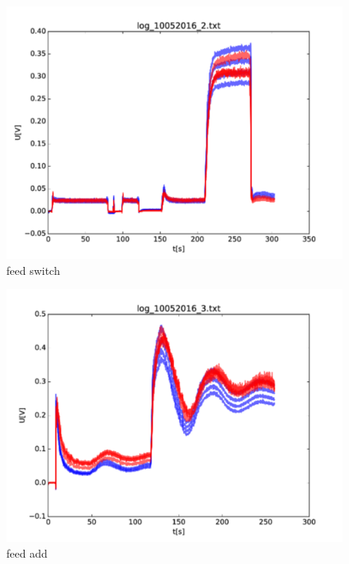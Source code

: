 \begin{figure}
	\begin{center}
		\includegraphics[width=\textwidth]{images/feed_switch.pdf} 
		\caption{feed switch}
	\end{center}
\end{figure}

\begin{figure}
	\begin{center}
		\includegraphics[width=\textwidth]{images/feed_add.pdf} 
		\caption{feed add}
	\end{center}
\end{figure}


